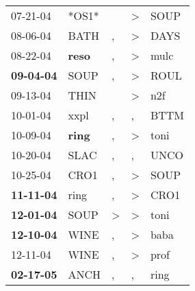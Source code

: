 \begin{supertabular}{p{0.07\textwidth}p{0.06\textwidth}p{0.02\textwidth}p{0.02\textwidth}p{0.06\textwidth}}
          07-21-04\textsuperscript{} &                            *OS1* &                  &     \textgreater &           SOUP\textsuperscript{} \\
          08-06-04\textsuperscript{} &           BATH\textsuperscript{} &                , &     \textgreater &           DAYS\textsuperscript{} \\
          08-22-04\textsuperscript{} &  \textbf{reso\textsuperscript{}} &                , &     \textgreater &           mulc\textsuperscript{} \\
 \textbf{09-04-04\textsuperscript{}} &           SOUP\textsuperscript{} &                , &     \textgreater &           ROUL\textsuperscript{} \\
          09-13-04\textsuperscript{} &           THIN\textsuperscript{} &                  &     \textgreater &            n2f\textsuperscript{} \\
          10-01-04\textsuperscript{} &           xxpl\textsuperscript{} &                , &                , &           BTTM\textsuperscript{} \\
          10-09-04\textsuperscript{} &  \textbf{ring\textsuperscript{}} &                , &     \textgreater &           toni\textsuperscript{} \\
          10-20-04\textsuperscript{} &           SLAC\textsuperscript{} &                , &                , &           UNCO\textsuperscript{} \\
          10-25-04\textsuperscript{} &           CRO1\textsuperscript{} &                , &     \textgreater &           SOUP\textsuperscript{} \\
 \textbf{11-11-04\textsuperscript{}} &           ring\textsuperscript{} &                , &     \textgreater &           CRO1\textsuperscript{} \\
 \textbf{12-01-04\textsuperscript{}} &           SOUP\textsuperscript{} &     \textgreater &     \textgreater &           toni\textsuperscript{} \\
 \textbf{12-10-04\textsuperscript{}} &           WINE\textsuperscript{} &                , &     \textgreater &           baba\textsuperscript{} \\
          12-11-04\textsuperscript{} &           WINE\textsuperscript{} &                , &     \textgreater &           prof\textsuperscript{} \\
 \textbf{02-17-05\textsuperscript{}} &           ANCH\textsuperscript{} &                , &                , &           ring\textsuperscript{} \\

\end{supertabular}
